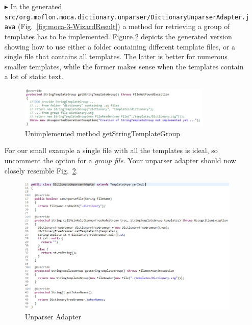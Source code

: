 \begin{enumerate}
\item[$\blacktriangleright$] In the generated \texttt{src/org.moflon.moca.dictionary.unparser/Dic\-tion\-ary\-Unparser\-Adapter.java} (Fig.~\ref{fig:moca-3-WizardResult}) a method for retrieving a group of templates has to be implemented.
Figure \ref{fig:moca-DictionaryUnparserAdapter} depicts the generated version showing how to use either a folder containing different template files, or a single file that contains all templates.
The latter is better for numerous smaller templates, while the former makes sense when the templates contain a lot of static text.
\clearpage 
\begin{figure}[!htbp]
\begin{center}
 \includegraphics[width=0.87\textwidth]{pics/moca/5MocaTreeToText/UnparserAdapterNotImplemented}
  \caption{Unimplemented method getStringTemplateGroup} 
  \label{fig:moca-DictionaryUnparserAdapter}
\end{center}
\end{figure} 

For our small example a single file with all the templates is ideal, so uncomment the option for a \emph{group file}.
Your unparser adapter should now closely resemble Fig.~\ref{fig:moca-DictionaryUnparserAdapter}.  
 
\begin{figure}[!htbp]
\begin{center}
 \includegraphics[width=\textwidth]{pics/moca/5MocaTreeToText/UnparserAdapter}
  \caption{Unparser Adapter} 
  \label{fig:moca-DictionaryUnparserAdapter}
\end{center}
\end{figure} 


\end{enumerate}
